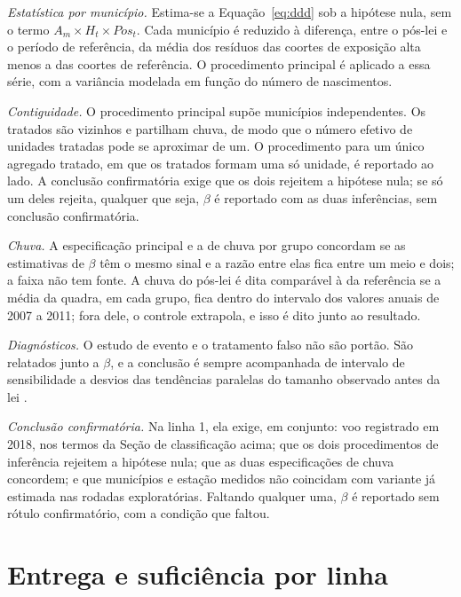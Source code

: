 \begin{apendicesenv}
\begin{alineas}
  \item \emph{Estatística por município.} Estima-se a
    Equação~\ref{eq:ddd} sob a hipótese nula, sem o termo
    $A_m \times H_t \times Pos_t$. Cada município é reduzido à diferença,
    entre o pós-lei e o período de referência, da média dos resíduos das
    coortes de exposição alta menos a das coortes de referência. O
    procedimento principal é aplicado a essa série, com a variância modelada
    em função do número de nascimentos.
  \item \emph{Contiguidade.} O procedimento principal supõe municípios
    independentes. Os tratados são vizinhos e partilham chuva, de modo que o
    número efetivo de unidades tratadas pode se aproximar de um. O
    procedimento para um único agregado tratado, em que os tratados formam
    uma só unidade, é reportado ao lado. A conclusão confirmatória exige que
    os dois rejeitem a hipótese nula; se só um deles rejeita, qualquer que
    seja, $\beta$ é reportado com as duas inferências, sem conclusão
    confirmatória.
  \item \emph{Chuva.} A especificação principal e a de chuva por grupo
    concordam se as estimativas de $\beta$ têm o mesmo sinal e a razão entre
    elas fica entre um meio e dois; a faixa não tem fonte. A chuva do pós-lei
    é dita comparável à da referência se a média da quadra, em cada grupo,
    fica dentro do intervalo dos valores anuais de 2007 a 2011; fora dele, o
    controle extrapola, e isso é dito junto ao resultado.
  \item \emph{Diagnósticos.} O estudo de evento e o tratamento falso não são
    portão. São relatados junto a $\beta$, e a conclusão é sempre acompanhada
    de intervalo de sensibilidade a desvios das tendências paralelas do
    tamanho observado antes da lei \cite{rambachan2023credible}.
  \item \emph{Conclusão confirmatória.} Na linha 1, ela exige, em conjunto:
    voo registrado em 2018, nos termos da Seção de classificação acima; que
    os dois procedimentos de inferência rejeitem a hipótese nula; que as duas
    especificações de chuva concordem; e que municípios e estação medidos não
    coincidam com variante já estimada nas rodadas exploratórias. Faltando
    qualquer uma, $\beta$ é reportado sem rótulo confirmatório, com a
    condição que faltou.
\end{alineas}

\section{Entrega e suficiência por linha}


\end{apendicesenv}
